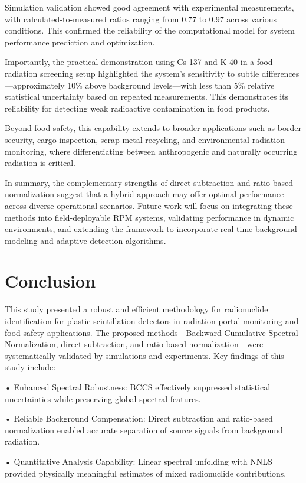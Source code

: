 \documentclass[10pt]{wlscirep}
\begin{document}
Simulation validation showed good agreement with experimental measurements, with calculated-to-measured ratios ranging from 0.77 to 0.97 across various conditions. This confirmed the reliability of the computational model for system performance prediction and optimization.

Importantly, the practical demonstration using Cs-137 and K-40 in a food radiation screening setup highlighted the system's sensitivity to subtle differences—approximately 10\% above background levels—with less than 5\% relative statistical uncertainty based on repeated measurements. This demonstrates its reliability for detecting weak radioactive contamination in food products.

Beyond food safety, this capability extends to broader applications such as border security, cargo inspection, scrap metal recycling, and environmental radiation monitoring, where differentiating between anthropogenic and naturally occurring radiation is critical.

In summary, the complementary strengths of direct subtraction and ratio-based normalization suggest that a hybrid approach may offer optimal performance across diverse operational scenarios. Future work will focus on integrating these methods into field-deployable RPM systems, validating performance in dynamic environments, and extending the framework to incorporate real-time background modeling and adaptive detection algorithms.

\section*{Conclusion}

This study presented a robust and efficient methodology for radionuclide identification for plastic scintillation detectors in radiation portal monitoring and food safety applications. The proposed methods—Backward Cumulative Spectral Normalization, direct subtraction, and ratio-based normalization—were systematically validated by simulations and experiments. Key findings of this study include:

• Enhanced Spectral Robustness: BCCS effectively suppressed statistical uncertainties while preserving global spectral features.

• Reliable Background Compensation: Direct subtraction and ratio-based normalization enabled accurate separation of source signals from background radiation.

• Quantitative Analysis Capability: Linear spectral unfolding with NNLS provided physically meaningful estimates of mixed radionuclide contributions.
\end{document}
